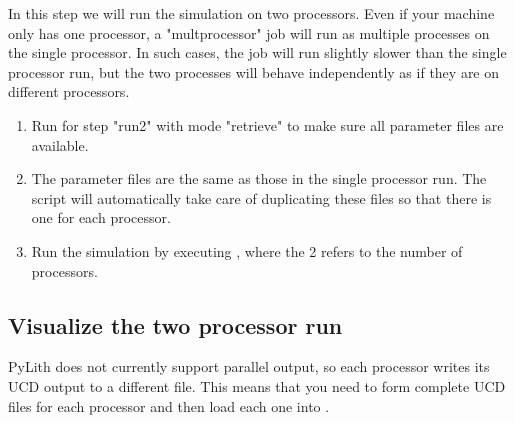 In this step we will run the simulation on two processors. Even if
your machine only has one processor, a "multprocessor" job will run as
multiple processes on the single processor. In such cases, the job
will run slightly slower than the single processor run, but the two
processes will behave independently as if they are on different
processors.

\begin{enumerate}
\item Run  for step "run2" with mode "retrieve" to
  make sure all parameter files are available.

  \begin{screen}
    \shellprompt{}
  \end{screen}
  
\item The parameter files are the same as those in the single
  processor run. The  script will automatically take
  care of duplicating these files so that there is one for each
  processor.
\item Run the simulation by executing , where
  the 2 refers to the number of processors.

  \begin{screen}
    \shellprompt{}
  \end{screen}
\end{enumerate}

\subsection{Visualize the two processor run}

PyLith does not currently support parallel output, so each processor
writes its UCD output to a different file. This means that you need to
form complete UCD files for each processor and then load each one into
.

